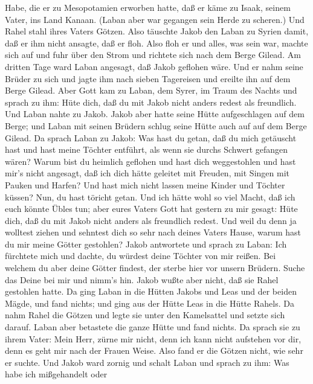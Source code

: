 Habe, die er zu Mesopotamien erworben hatte, daß er käme zu Isaak,
seinem Vater, ins Land Kanaan.  (Laban aber war gegangen
sein Herde zu scheren.) Und Rahel stahl ihres Vaters Götzen.
 Also täuschte Jakob den Laban zu Syrien damit, daß er ihm
nicht ansagte, daß er floh.  Also floh er und alles, was
sein war, machte sich auf und fuhr über den Strom und richtete sich nach
dem Berge Gilead.  Am dritten Tage ward Laban angesagt, daß
Jakob geflohen wäre.  Und er nahm seine Brüder zu sich und
jagte ihm nach sieben Tagereisen und ereilte ihn auf dem Berge Gilead.
 Aber Gott kam zu Laban, dem Syrer, im Traum des Nachts und
sprach zu ihm: Hüte dich, daß du mit Jakob nicht anders redest als
freundlich.  Und Laban nahte zu Jakob. Jakob aber hatte
seine Hütte aufgeschlagen auf dem Berge; und Laban mit seinen Brüdern
schlug seine Hütte auch auf auf dem Berge Gilead.  Da
sprach Laban zu Jakob: Was hast du getan, daß du mich getäuscht hast und
hast meine Töchter entführt, als wenn sie durchs Schwert gefangen wären?
 Warum bist du heimlich geflohen und hast dich weggestohlen
und hast mir's nicht angesagt, daß ich dich hätte geleitet mit Freuden,
mit Singen mit Pauken und Harfen?  Und hast mich nicht
lassen meine Kinder und Töchter küssen? Nun, du hast töricht getan.
 Und ich hätte wohl so viel Macht, daß ich euch könnte
Übles tun; aber eures Vaters Gott hat gestern zu mir gesagt: Hüte dich,
daß du mit Jakob nicht anders als freundlich redest.  Und
weil du denn ja wolltest ziehen und sehntest dich so sehr nach deines
Vaters Hause, warum hast du mir meine Götter gestohlen? 
Jakob antwortete und sprach zu Laban: Ich fürchtete mich und dachte, du
würdest deine Töchter von mir reißen.  Bei welchem du aber
deine Götter findest, der sterbe hier vor unsern Brüdern. Suche das
Deine bei mir und nimm's hin. Jakob wußte aber nicht, daß sie Rahel
gestohlen hatte.  Da ging Laban in die Hütten Jakobs und
Leas und der beiden Mägde, und fand nichts; und ging aus der Hütte Leas
in die Hütte Rahels.  Da nahm Rahel die Götzen und legte
sie unter den Kamelsattel und setzte sich darauf. Laban aber betastete
die ganze Hütte und fand nichts.  Da sprach sie zu ihrem
Vater: Mein Herr, zürne mir nicht, denn ich kann nicht aufstehen vor
dir, denn es geht mir nach der Frauen Weise. Also fand er die Götzen
nicht, wie sehr er suchte.  Und Jakob ward zornig und
schalt Laban und sprach zu ihm: Was habe ich mißgehandelt oder
